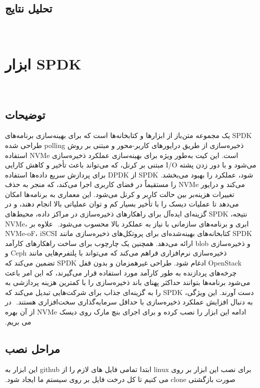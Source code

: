 ‫
‫‫\subsection*{تحلیل نتایج}
‫
‫‫\section{ابزار SPDK}
‫
‫‫\subsection*{توضیحات}
‫
‫SPDK یک مجموعه متن‌باز از ابزارها و کتابخانه‌ها است که برای بهینه‌سازی برنامه‌های ذخیره‌سازی از طریق درایورهای کاربر-محور و مبتنی بر روش polling طراحی شده است. این کیت به‌طور ویژه برای بهینه‌سازی عملکرد ذخیره‌سازی NVMe استفاده می‌شود و با دور زدن پشته I/O مبتنی بر کرنل، که می‌تواند باعث تأخیر و کاهش کارایی شود، عملکرد را بهبود می‌بخشد. SPDK از DPDK برای پردازش سریع داده‌ها استفاده می‌کند و درایور NVMe را مستقیماً در فضای کاربری اجرا می‌کند، که منجر به حذف تغییرات هزینه‌بر بین حالت کاربر و کرنل می‌شود. این معماری به برنامه‌ها امکان می‌دهد تا عملیات دیسک را با تأخیر بسیار کم و توان عملیاتی بالا انجام دهند، و در نتیجه، SPDK گزینه‌ای ایده‌آل برای راهکارهای ذخیره‌سازی در مراکز داده، محیط‌های ابری و برنامه‌های سازمانی با نیاز به عملکرد بالا محسوب می‌شود.
‫
‫علاوه بر NVMe، SPDK کتابخانه‌های بهینه‌شده‌ای برای پروتکل‌های ذخیره‌سازی مانند   NVMe-oF، iSCSI و ذخیره‌سازی blob ارائه می‌دهد. همچنین یک چارچوب برای ساخت راهکارهای کارآمد ذخیره‌سازی نرم‌افزاری فراهم می‌کند که می‌تواند با پلتفرم‌هایی مانند Ceph و OpenStack ادغام شود. طراحی غیرهمزمان و بدون قفل SPDK تضمین می‌کند که چرخه‌های پردازنده به طور کارآمد مورد استفاده قرار می‌گیرند، که این امر باعث می‌شود برنامه‌ها بتوانند حداکثر پهنای باند ذخیره‌سازی را با کمترین هزینه پردازشی به دست آورند. این ویژگی، SPDK را به گزینه‌ای جذاب برای شرکت‌هایی تبدیل می‌کند که به دنبال افزایش عملکرد ذخیره‌سازی با حداقل سرمایه‌گذاری سخت‌افزاری هستند.
‫
‫در ادامه این ابزار را نصب کرده و برای اجرای بنچ مارک روی دیسک NVMe از آن بهره می بریم.
‫
‫‫\subsection*{مراحل نصب}
‫برای نصب این ابزار بر روی linux ابتدا تمامی فایل های لازم را از github این ابزار به صورت بازگشتی clone می کنیم تا کل درخت فایل بر روی سیستم ما ایجاد شود.

